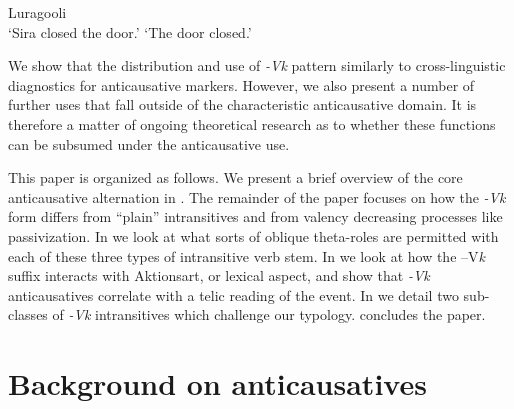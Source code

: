 \documentclass[output=paper]{langsci/lanmgscibook}
\begin{document}
\ea\label{ex:gluckman:2}{Luragooli}{}{}\\
\glt ‘Sira closed the door.’
\glt ‘The door closed.’
\z
\z

We show that the distribution and use of \textit{-Vk} pattern similarly to cross-linguistic diagnostics for anticausative markers. However, we also present a number of further uses that fall outside of the characteristic anticausative domain. It is therefore a matter of ongoing theoretical research as to whether these functions can be subsumed under the anticausative use.
 
This paper is organized as follows. We present a brief overview of the core anticausative alternation in . The remainder of the paper focuses on how the \textit{-Vk} form differs from “plain” intransitives and from valency decreasing processes like passivization. In  we look at what sorts of oblique theta-roles are permitted with each of these three types of intransitive verb stem. In  we look at how the –V\textit{k} suffix interacts with Aktionsart, or lexical aspect, and show that \textit{-Vk} anticausatives correlate with a telic reading of the event. In  we detail two sub-classes of \textit{-Vk} intransitives which challenge our typology.  concludes the paper. 

\section{Background on anticausatives}\label{sec:gluckman:2}
\end{document}
